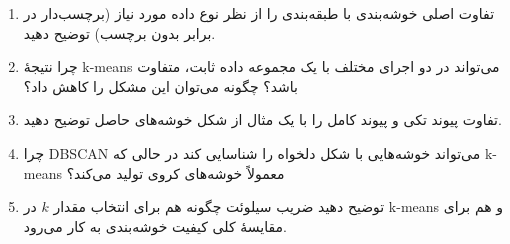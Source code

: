 \begin{enumerate}
    \item تفاوت اصلی خوشه‌بندی با طبقه‌بندی را از نظر نوع داده مورد نیاز
          (برچسب‌دار در برابر بدون برچسب) توضیح دهید.
    \item چرا نتیجهٔ k-means می‌تواند در دو اجرای مختلف با یک مجموعه
          داده ثابت، متفاوت باشد؟ چگونه می‌توان این مشکل را کاهش داد؟
    \item تفاوت پیوند تکی و پیوند کامل را با یک مثال از شکل خوشه‌های
          حاصل توضیح دهید.
    \item چرا DBSCAN می‌تواند خوشه‌هایی با شکل دلخواه را شناسایی کند در
          حالی که k-means معمولاً خوشه‌های کروی تولید می‌کند؟
    \item توضیح دهید ضریب سیلوئت چگونه هم برای انتخاب مقدار $k$ در
          k-means و هم برای مقایسهٔ کلی کیفیت خوشه‌بندی به کار می‌رود.
\end{enumerate}
